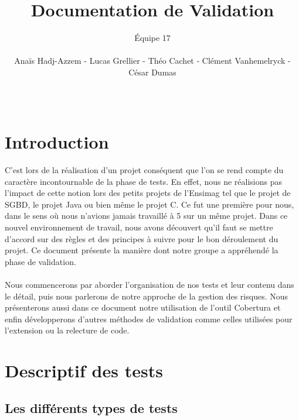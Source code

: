 \documentclass{article}
\title{\vspace{\fill} Documentation de Validation \vspace{\fill}}
\author{Équipe 17 \\\\ Anaïs Hadj-Azzem - Lucas Grellier - Théo Cachet - Clément Vanhemelryck - César Dumas}
\date{\\}
\begin{document}
\maketitle
\thispagestyle{empty}
\setcounter{page}{0}
\newpage

\tableofcontents
\thispagestyle{empty}
\setcounter{page}{0}
\newpage

\section{Introduction}

C'est lors de la réalisation d'un projet conséquent que l'on se rend compte du caractère incontournable de la phase de tests. En effet,
nous ne réalisions pas l'impact de cette notion lors des petits projets de l'Ensimag tel que le projet de SGBD, le projet Java ou
bien même le projet C. Ce fut une première pour nous, dans le sens où nous n'avions jamais travaillé à 5 sur un même projet. Dans ce nouvel
environnement de travail, nous avons découvert qu'il faut se mettre d'accord sur des règles et des principes à suivre pour le
bon déroulement du projet. Ce document présente la manière dont notre groupe a appréhendé la phase de validation.
\\\\
Nous commencerons par aborder l'organisation de nos tests et leur contenu dans le détail, puis nous parlerons de notre approche de la gestion des risques.
Nous présenterons aussi dans ce document notre utilisation de l'outil Cobertura et enfin développerons d'autres méthodes de validation
comme celles utilisées pour l'extension ou la relecture de code.

\section{Descriptif des tests}

\subsection{Les différents types de tests}
\end{document}
